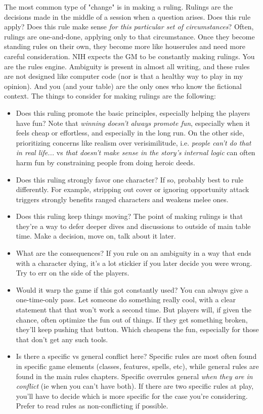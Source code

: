 \documentclass[10pt,twoside,openany,bg=none]{dndbook}
\begin{document}
The most common type of "change" is in making a ruling. Rulings are the decisions made in the middle of a session when a question arises. Does this rule apply? Does this rule make sense \textit{for this particular set of circumstances}? Often, rulings are one-and-done, applying only to that circumstance. Once they become standing rules on their own, they become more like houserules and need more careful consideration. NIH expects the GM to be constantly making rulings. You are the rules engine. Ambiguity is present in almost all writing, and these rules are not designed like computer code (nor is that a healthy way to play in my opinion). And you (and your table) are the only ones who know the fictional context. The things to consider for making rulings are the following:
\begin{itemize}
    \item Does this ruling promote the basic principles, especially helping the players have fun? Note that \textit{winning doesn't always promote fun}, especially when it feels cheap or effortless, and especially in the long run. On the other side, prioritizing concerns like realism over verisimilitude, i.e. \textit{people can't do that in real life...} vs \textit{that doesn't make sense in the story's internal logic} can often harm fun by constraining people from doing heroic deeds.
    \item Does this ruling strongly favor one character? If so, probably best to rule differently. For example, stripping out cover or ignoring opportunity attack triggers strongly benefits ranged characters and weakens melee ones.
    \item Does this ruling keep things moving? The point of making rulings is that they're a way to defer deeper dives and discussions to outside of main table time. Make a decision, move on, talk about it later.
    \item What are the consequences? If you rule on an ambiguity in a way that ends with a character dying, it's a lot stickier if you later decide you were wrong. Try to err on the side of the players.
    \item Would it warp the game if this got constantly used? You can always give a one-time-only pass. Let someone do something really cool, with a clear statement that that won't work a second time. But players will, if given the chance, often optimize the fun out of things. If they get something broken, they'll keep pushing that button. Which cheapens the fun, especially for those that don't get any such tools.
    \item Is there a specific vs general conflict here? Specific rules are most often found in specific game elements (classes, features, spells, etc), while general rules are found in the main rules chapters. Specific overrules general \textit{when they are in conflict} (ie when you can't have both). If there are two specific rules at play, you'll have to decide which is more specific for the case you're considering. Prefer to read rules as non-conflicting if possible.

\end{itemize}
\end{document}
